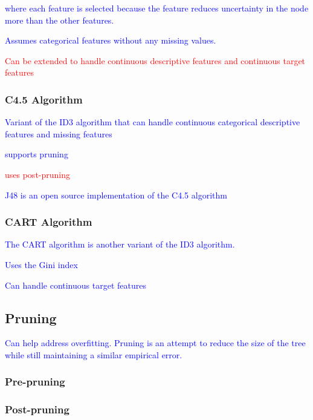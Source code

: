 \textcolor{blue}{where each feature is selected because the feature reduces uncertainty in the node more than the other features.}

\textcolor{blue}{Assumes categorical features without any missing values.}

\textcolor{red}{Can be extended to handle continuous descriptive features and continuous target features}


\subsubsection{C4.5 Algorithm}

\textcolor{blue}{Variant of the {ID3 algorithm} that can handle continuous categorical descriptive features and missing features}

\textcolor{blue}{supports pruning}

\textcolor{red}{uses post-pruning}

\textcolor{blue}{{J48} is an open source implementation of the C4.5 algorithm}

\subsubsection{CART Algorithm}

\textcolor{blue}{The CART algorithm is another variant of the ID3 algorithm.}

\textcolor{blue}{Uses the Gini index}

\textcolor{blue}{Can handle continuous target features}


\subsection{Pruning}

\textcolor{blue}{Can help address overfitting. Pruning is an attempt to reduce the size of the tree while still maintaining a similar empirical error.}

\subsubsection{Pre-pruning}

\subsubsection{Post-pruning}

